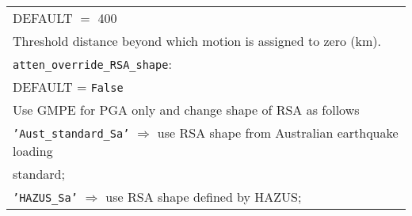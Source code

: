 \documentclass[a4paper, 12pt]{report}
\begin{document}
\begin{tabular}{|p{\textwidth}|}
DEFAULT $=$ 400 \\
Threshold distance beyond which motion is assigned to zero (km). \\
\hline \vspace{0.1em} \texttt{atten\_override\_RSA\_shape}: \\
DEFAULT = \texttt{False} \\
Use GMPE for PGA only and change shape of RSA as follows\\
 \hspace{0.5em} \texttt{'Aust\_standard\_Sa'} $\Rightarrow$
use RSA shape from Australian earthquake loading \\
\hspace{11em} standard; \\
 \hspace{0.5em} \texttt{'HAZUS\_Sa'}  $\Rightarrow$ use RSA shape defined by HAZUS;\\
\hline
\end{tabular}
\end{document}
